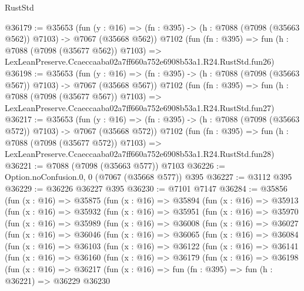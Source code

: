 \begin{lexlean}{RustStd}
\begin{coremodule}
@36179 := @35653
    (fun (y : @16) => (fn : @395) -> (h : @7088 (@7098 (@35663 @562)) @7103) -> @7067 (@35668 @562))
    @7102
    (fun (fn : @395) =>
    fun (h : @7088 (@7098 (@35677 @562)) @7103) =>
    LexLeanPreserve.Ccaeccaaba02a7ff660a752e6908b53a1.R24.RustStd.fun26)
@36198 := @35653
    (fun (y : @16) => (fn : @395) -> (h : @7088 (@7098 (@35663 @567)) @7103) -> @7067 (@35668 @567))
    @7102
    (fun (fn : @395) =>
    fun (h : @7088 (@7098 (@35677 @567)) @7103) =>
    LexLeanPreserve.Ccaeccaaba02a7ff660a752e6908b53a1.R24.RustStd.fun27)
@36217 := @35653
    (fun (y : @16) => (fn : @395) -> (h : @7088 (@7098 (@35663 @572)) @7103) -> @7067 (@35668 @572))
    @7102
    (fun (fn : @395) =>
    fun (h : @7088 (@7098 (@35677 @572)) @7103) =>
    LexLeanPreserve.Ccaeccaaba02a7ff660a752e6908b53a1.R24.RustStd.fun28)
@36221 := @7088 (@7098 (@35663 @577)) @7103
@36226 := Option.noConfusion.{0, 0} (@7067 (@35668 @577)) @395
@36227 := @3112 @395
@36229 := @36226 @36227 @395
@36230 := @7101 @7147
@36284 := @35856
    (fun (x : @16) =>
    @35875
      (fun (x : @16) =>
      @35894
        (fun (x : @16) =>
        @35913
          (fun (x : @16) =>
          @35932
            (fun (x : @16) =>
            @35951
              (fun (x : @16) =>
              @35970
                (fun (x : @16) =>
                @35989
                  (fun (x : @16) =>
                  @36008
                    (fun (x : @16) =>
                    @36027
                      (fun (x : @16) =>
                      @36046
                        (fun (x : @16) =>
                        @36065
                          (fun (x : @16) =>
                          @36084
                            (fun (x : @16) =>
                            @36103
                              (fun (x : @16) =>
                              @36122
                                (fun (x : @16) =>
                                @36141
                                  (fun (x : @16) =>
                                  @36160
                                    (fun (x : @16) =>
                                    @36179
                                      (fun (x : @16) =>
                                      @36198
                                        (fun (x : @16) =>
                                        @36217
                                          (fun (x : @16) =>
                                          fun (fn : @395) =>
                                          fun (h : @36221) =>
                                          @36229
                                            @36230

\end{coremodule}
\end{lexlean}
